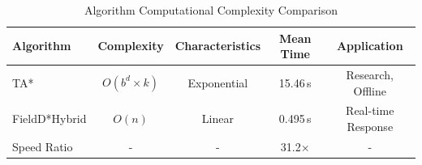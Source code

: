 \begin{table}[htbp]
\centering
\caption{Algorithm Computational Complexity Comparison}
\label{tab:complexity_comparison}
\begin{tabular}{lcccc}
\hline
Algorithm & Complexity & Characteristics & Mean Time & Application \\
\hline
TA* & $O(b^d \times k)$ & Exponential & 15.46\,s & Research, Offline \\
FieldD*Hybrid & $O(n)$ & Linear & 0.495\,s & Real-time Response \\
\hline
Speed Ratio & - & - & 31.2$\times$ & - \\
\hline
\end{tabular}
\end{table}
